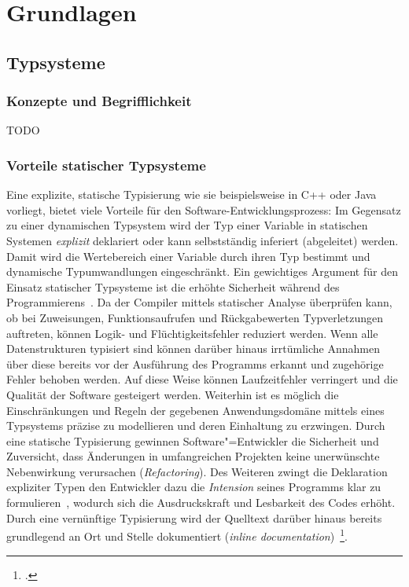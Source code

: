 \chapter{Grundlagen}
\label{chap:basics}

\section{Typsysteme}

\subsection{Konzepte und Begrifflichkeit}

TODO

\subsection{Vorteile statischer Typsysteme}

Eine explizite, statische Typisierung wie sie beispielsweise in C++ oder Java vorliegt, bietet viele Vorteile für den Software-Entwicklungsprozess: Im Gegensatz zu einer dynamischen Typsystem wird der Typ einer Variable in statischen Systemen \emph{explizit} deklariert oder kann selbstständig inferiert (abgeleitet) werden. Damit wird die Wertebereich einer Variable durch ihren Typ bestimmt und dynamische Typumwandlungen eingeschränkt.
Ein gewichtiges Argument für den Einsatz statischer Typsysteme ist die erhöhte Sicherheit während des Programmierens~\autocite{CORNELL:STRONG_TYPING}. Da der Compiler mittels statischer Analyse überprüfen kann, ob bei Zuweisungen, Funktionsaufrufen und Rückgabewerten Typverletzungen auftreten, können Logik- und Flüchtigkeitsfehler reduziert werden. Wenn alle Datenstrukturen typisiert sind können darüber hinaus irrtümliche Annahmen über diese bereits vor der Ausführung des Programms erkannt und zugehörige Fehler behoben werden. Auf diese Weise können Laufzeitfehler verringert und die Qualität der Software gesteigert werden. Weiterhin ist es möglich die Einschränkungen und Regeln der gegebenen Anwendungsdomäne mittels eines Typsystems präzise zu modellieren und deren Einhaltung zu erzwingen. Durch eine statische Typisierung gewinnen Software"=Entwickler die Sicherheit und Zuversicht, dass Änderungen in umfangreichen Projekten keine unerwünschte Nebenwirkung verursachen (\textit{Refactoring}).
Des Weiteren zwingt die Deklaration expliziter Typen den Entwickler dazu die \emph{Intension} seines Programms klar zu formulieren~\autocite[96]{WALDMANN:PPS}, wodurch sich die Ausdruckskraft und Lesbarkeit des Codes erhöht. Durch eine vernünftige Typisierung wird der Quelltext darüber hinaus bereits grundlegend an Ort und Stelle dokumentiert (\textit{inline documentation})~\footcite[Abschnitt 6.1.1]{MITCHELL:CONCEPTS}.

